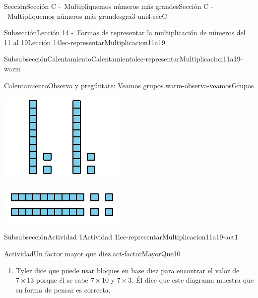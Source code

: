 \documentclass[twoside,10pt,]{article}
\begin{document}
\begin{sectionptx}{Sección}{Sección C -~Multipliquemos números más grandes}{}{Sección C -~Multipliquemos números más grandes}{}{}{gra3-uni4-secC}
\begin{subsectionptx}{Subsección}{Lección 14 -~Formas de representar la multiplicación de números del 11 al 19}{}{Lección 14}{}{}{lec-representarMultiplicacion11a19}
\begin{subsubsectionptx}{Subsubsección}{Calentamiento}{}{Calentamiento}{}{}{lec-representarMultiplicacion11a19-warm}
\begin{exploration}{Calentamiento}{Observa y pregúntate: Veamos grupos.}{warm-observa-veamosGrupos}
\begin{sidebyside}{3}{0}{0}{0}
\begin{sbspanel}{0.333333333333333}
\includegraphics[width=\linewidth]{external/svg-source/tikz-file-149347-scale13.pdf}
\end{sbspanel}%
\begin{sbspanel}{0.333333333333333}%
\includegraphics[width=\linewidth]{external/svg-source/tikz-file-141822-scale13.pdf}
\end{sbspanel}%
\end{sidebyside}%
\end{exploration}%
\end{subsubsectionptx}
%
%
\typeout{************************************************}
\typeout{************************************************}
%
\begin{subsubsectionptx}{Subsubsección}{Actividad 1}{}{Actividad 1}{}{}{lec-representarMultiplicacion11a19-act1}
\begin{activity}{Actividad}{Un factor mayor que diez.}{act-factorMayorQue10}%
%
\begin{enumerate}
\item{}Tyler dice que puede usar bloques en base diez para encontrar el valor de \(7\times 13\) porque él se sabe \(7\times 10\) y \(7\times 3\). Él dice que este diagrama muestra que su forma de pensar es correcta.%
\begin{image}{0}{1}{0}{}%

\end{image}
\end{enumerate}
\end{activity}
\end{subsubsectionptx}
\end{subsectionptx}
\end{sectionptx}
\end{document}
